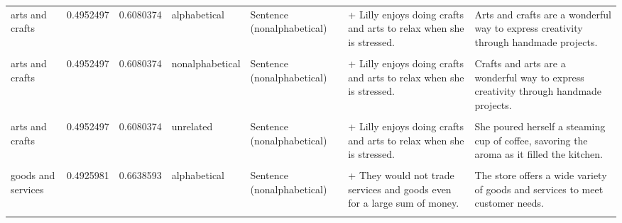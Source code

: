 \documentclass[
  12pt,
]{scrartcl}
\begin{document}
\begin{landscape}
\begin{longtable}{lrrllll}
arts and crafts & 0.4952497 & 0.6080374 & alphabetical & Sentence (nonalphabetical) & + Lilly enjoys doing crafts and arts to relax when she is stressed. & Arts and crafts are a wonderful way to express creativity through handmade projects.\\
\cellcolor{gray!6}{arts and crafts} & \cellcolor{gray!6}{0.4952497} & \cellcolor{gray!6}{0.6080374} & \cellcolor{gray!6}{nonalphabetical} & \cellcolor{gray!6}{Sentence (alphabetical)} & \cellcolor{gray!6}{+ Lilly enjoys doing arts and crafts to relax when she is stressed.} & \cellcolor{gray!6}{Crafts and arts are a wonderful way to express creativity through handmade projects.}\\
\addlinespace
arts and crafts & 0.4952497 & 0.6080374 & nonalphabetical & Sentence (nonalphabetical) & + Lilly enjoys doing crafts and arts to relax when she is stressed. & Crafts and arts are a wonderful way to express creativity through handmade projects.\\
\cellcolor{gray!6}{arts and crafts} & \cellcolor{gray!6}{0.4952497} & \cellcolor{gray!6}{0.6080374} & \cellcolor{gray!6}{unrelated} & \cellcolor{gray!6}{Sentence (alphabetical)} & \cellcolor{gray!6}{+ Lilly enjoys doing arts and crafts to relax when she is stressed.} & \cellcolor{gray!6}{She poured herself a steaming cup of coffee, savoring the aroma as it filled the kitchen.}\\
arts and crafts & 0.4952497 & 0.6080374 & unrelated & Sentence (nonalphabetical) & + Lilly enjoys doing crafts and arts to relax when she is stressed. & She poured herself a steaming cup of coffee, savoring the aroma as it filled the kitchen.\\
\cellcolor{gray!6}{goods and services} & \cellcolor{gray!6}{0.4925981} & \cellcolor{gray!6}{0.6638593} & \cellcolor{gray!6}{alphabetical} & \cellcolor{gray!6}{Sentence (alphabetical)} & \cellcolor{gray!6}{+ They would not trade goods and services even for a large sum of money.} & \cellcolor{gray!6}{The store offers a wide variety of goods and services to meet customer needs.}\\
goods and services & 0.4925981 & 0.6638593 & alphabetical & Sentence (nonalphabetical) & + They would not trade services and goods even for a large sum of money. & The store offers a wide variety of goods and services to meet customer needs.\\
\addlinespace
\cellcolor{gray!6}{goods and services} & \cellcolor{gray!6}{0.4925981} & \cellcolor{gray!6}{0.6638593} & \cellcolor{gray!6}{nonalphabetical} & \cellcolor{gray!6}{Sentence (alphabetical)} & \cellcolor{gray!6}{+ They would not trade goods and services even for a large sum of money.} & \cellcolor{gray!6}{The store offers a wide variety of services and goods to meet customer needs.}\\

\end{longtable}
\end{landscape}
\end{document}

